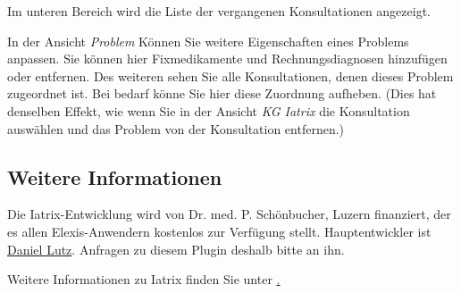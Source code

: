 Im unteren Bereich wird die Liste der vergangenen Konsultationen angezeigt.

In der Ansicht \textit{Problem} Können Sie weitere Eigenschaften eines Problems
anpassen. Sie können hier Fixmedikamente und Rechnungsdiagnosen hinzufügen
oder entfernen. Des weiteren sehen Sie alle Konsultationen, denen dieses
Problem zugeordnet ist. Bei bedarf könne Sie hier diese Zuordnung aufheben.
(Dies hat denselben Effekt, wie wenn Sie in der Ansicht \textit{KG Iatrix}
die Konsultation auswählen und das Problem von der Konsultation entfernen.)

\subsection{Weitere Informationen}

Die Iatrix-Entwicklung wird von Dr. med. P. Schönbucher, Luzern finanziert, der
es allen Elexis-Anwendern kostenlos zur Verfügung stellt. Hauptentwickler ist
\href{http://www.elexis.ch/jp/component/option,com_contact/task,view/contact_id,2/Itemid,32/}{Daniel Lutz}.
Anfragen zu diesem Plugin deshalb bitte an ihn.

Weitere Informationen zu Iatrix finden Sie unter \href{http://www.iatrix.org/}.

